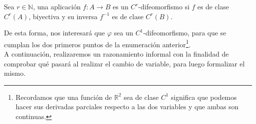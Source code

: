 \begin{definicion}[Difeomorfismo]
    Sea $r\in \mathbb{N}$, una aplicación $f:A\rightarrow B$ es un \newline$C^r$-difeomorfismo si $f$ es de clase $C^r(A)$, biyectiva y su inversa $f^{-1}$ es de clase $C^r(B)$.
\end{definicion}
De esta forma, nos interesará que $\varphi$ sea un $C^1$-difeomorfismo, para que se cumplan los dos primeros puntos de la enumeración anterior\footnote{Recordamos que una función de $\mathbb{R}^2$ sea de clase $C^1$ significa que podemos hacer sus derivadas parciales respecto a las dos variables y que ambas son continuas.}.\\

A continuación, realizaremos un razonamiento informal con la finalidad de comprobar qué pasará al realizar el cambio de variable, para luego formalizar el mismo.\\

